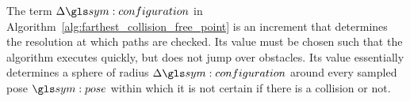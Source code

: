 	The term $\Delta\configuration$ in
	Algorithm~\ref{alg:farthest_collision_free_point} is an increment that
	determines the resolution at which paths are checked. Its value must be
	chosen such that the algorithm executes quickly, but does not jump over
	obstacles. Its value essentially determines a sphere of radius
	$\Delta\configuration$ around every sampled pose $\pose$ within which it
	is not certain if there is a collision or not.


